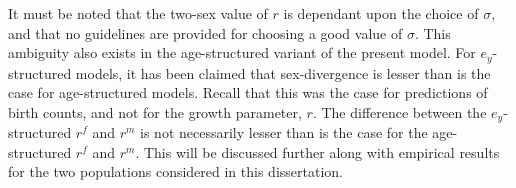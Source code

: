 It must be
noted that the two-sex value of $r$ is dependant upon the choice of $\sigma$, 
and that no guidelines are provided for choosing a good value of $\sigma$. 
This ambiguity also exists in the age-structured variant of the present model. 
For $e_y$-structured models, it has been claimed that sex-divergence is 
lesser than is the case for
age-structured models. Recall that this was the case for predictions of birth
counts, and not for the growth parameter, $r$. The
difference between the $e_y$-structured $r^f$ and $r^m$ is not necessarily 
lesser than is the case for the age-structured $r^f$ and $r^m$. This will be
discussed further along with empirical results for the two populations 
considered in this dissertation.
